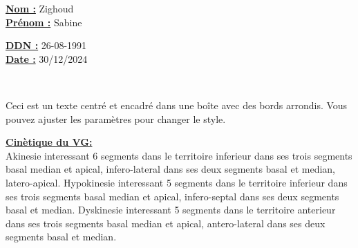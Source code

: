 \documentclass[12pt,a4paper]{article}%
\begin{document}
%
\normalsize%
\begin{minipage}{0.5\linewidth}%
\textbf{\underline{Nom :}} \hspace{1cm} Zighoud%
\\%
\textbf{\underline{Prénom :}} \hspace{1cm} Sabine%
\\%
\end{minipage}%
\begin{minipage}{0.5\linewidth}%
\textbf{\underline{DDN :}} \hspace{1cm} 26-08-1991%
\\%
\textbf{\underline{Date :}} \hspace{1cm} 30/12/2024%
\\%
\end{minipage}%
\hspace{\textwidth}%
\\%
\begin{center}%

            \begin{tcolorbox}[
                colframe=blue,        %
                colback=white,        %
                coltitle=black,       %
                arc=8pt,              %
                boxrule=1mm,          %
                width=0.8\textwidth,  %
                auto outer arc,       %
            ]
            Ceci est un texte centré et encadré dans une boîte avec des bords arrondis.
            Vous pouvez ajuster les paramètres pour changer le style.
            \end{tcolorbox}
\end{center}%
%
\vspace*{\baselineskip}%
\textbf{\ul{Cinètique du VG:}}%
\\%
Akinesie interessant 6 segments dans le territoire inferieur dans ses trois segments basal median et apical, infero{-}lateral dans ses deux segments basal et median, latero{-}apical. Hypokinesie interessant 5 segments dans le territoire inferieur dans ses trois segments basal median et apical, infero{-}septal dans ses deux segments basal et median. Dyskinesie interessant 5 segments dans le territoire anterieur dans ses trois segments basal median et apical, antero{-}lateral dans ses deux segments basal et median.%
\\%
\\%
\end{document}
